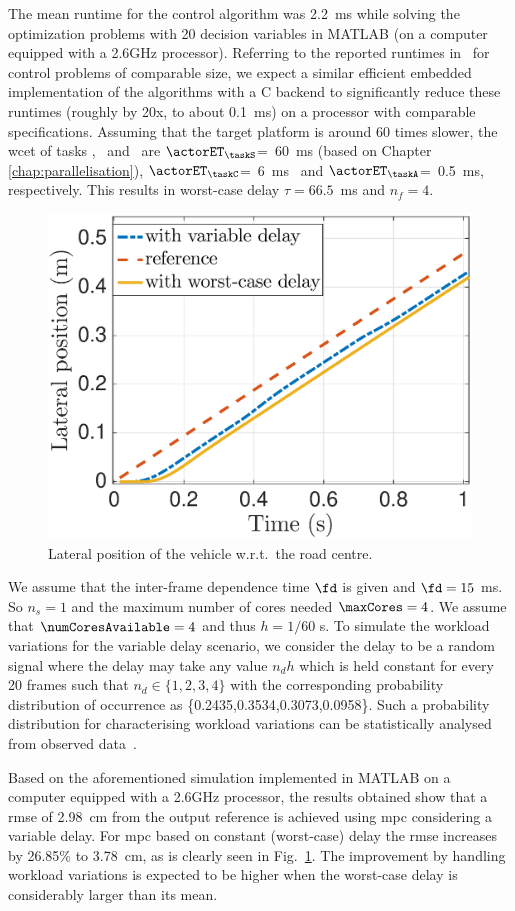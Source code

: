 The mean runtime for the control algorithm was 2.2~ms while solving the optimization problems with 20 decision variables in MATLAB (on a computer equipped with a 2.6GHz processor). Referring to the reported runtimes in~\cite{sparseNMPC} for control problems of comparable size, we expect a similar efficient embedded implementation of the algorithms with a C backend to significantly reduce these runtimes (roughly by 20x, to about 0.1~ms) on a processor with comparable specifications. Assuming that the target platform is around 60 times slower, the \gls{wcet} of tasks \taskS, \taskC\ and \taskA\ are $\actorET_{\taskS}$=~60~ms (based on Chapter \ref{chap:parallelisation}), $\actorET_{\taskC}$=~6~ms~\cite{sparseNMPC} and $\actorET_{\taskA}$=~0.5~ms, respectively. This results in worst-case delay $\tau=66.5$~ms and $n_f=4$.
\begin{figure}[t]
    \centering
    \includegraphics[height=0.5\linewidth]{images/simresults3.eps}
    \caption{Lateral position of the vehicle w.r.t.\ the road centre.}
    \label{fig:ch6_comparison}
    \vspace{-2em}
\end{figure}

We assume that the inter-frame dependence time $\fd$ is given and $\fd=15$ ms. 
So $n_s=1$ and the maximum number of cores needed $\maxCores=4$.
We assume that $\numCoresAvailable=4$ and thus $h=1/60$ s.
To simulate the workload variations for the variable delay scenario, we consider the delay to be a random signal where the delay may take any value $n_d h$ which is held constant for every 20 frames such that $n_d\in\{1,2,3,4\}$ with the corresponding probability distribution of occurrence as \{0.2435,0.3534,0.3073,0.0958\}. Such a probability distribution for characterising workload variations can be statistically analysed from observed data~\cite{fontantelli2013optimal}.

Based on the aforementioned simulation implemented in MATLAB on a computer equipped with a 2.6GHz processor, the results obtained show that a \gls{rmse} of 2.98~cm from the output reference is achieved using \gls{mpc} considering a variable delay. 
For \gls{mpc} based on constant (worst-case) delay the \gls{rmse} increases by 26.85\% to 3.78~cm, as is clearly seen in Fig.~\ref{fig:ch6_comparison}. The improvement by handling workload variations is expected to be higher when the worst-case delay is considerably larger than its mean. 

